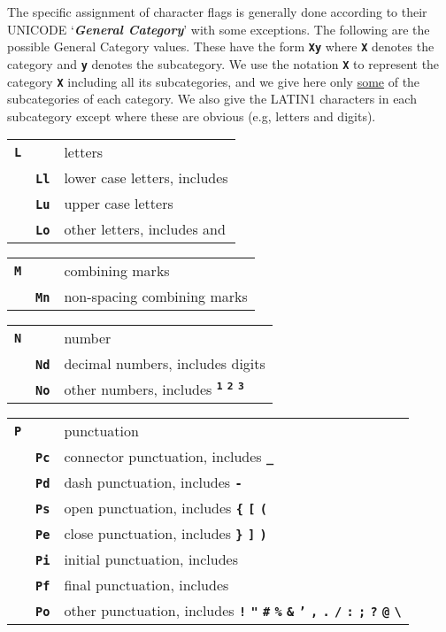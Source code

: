 \documentclass[12pt]{article}
\newcommand{\TT}[1]{{\tt \bfseries #1}}
\newcommand{\key}[1]{{\bf \em #1}\index{#1}}
\newenvironment{indpar}[1][0.3in]%
	{\begin{list}{}%
		     {\setlength{\itemsep}{0in}%
		      \setlength{\topsep}{0in}%
		      \setlength{\parsep}{1ex}%
		      \setlength{\labelwidth}{#1}%
		      \setlength{\leftmargin}{#1}%
		      \addtolength{\leftmargin}{\labelsep}}%
	 \item}%
	{\end{list}}
\begin{document}
The specific assignment of character flags is generally done
according to their
UNICODE `\key{General Category}' with some exceptions.
The following are the possible General Category values.
These have the form \TT{Xy} where \TT{X} denotes the category
and \TT{y} denotes the subcategory.  We use the notation
\TT{X} to represent the category \TT{X} including all its
subcategories, and we give here only \underline{some} of the
subcategories of each category.  We also give the LATIN1 characters
in each subcategory except where these are obvious (e.g, letters
and digits).
\begin{indpar}
\begin{tabular}{ll}
\TT{L}		& letters \\
~~~\TT{Ll}	& lower case letters, includes \TT{\textmu} \\
~~~\TT{Lu}	& upper case letters \\
~~~\TT{Lo}	& other letters, includes
                  \TT{\textordmasculine} and \TT{\textordfeminine} \\
\end{tabular}

\begin{tabular}{ll}
\TT{M}		& combining marks \\
~~~\TT{Mn}	& non-spacing combining marks \\
\end{tabular}

\begin{tabular}{ll}
\TT{N}		& number \\
~~~\TT{Nd}	& decimal numbers, includes digits \\
~~~\TT{No}	& other numbers, includes
                  \TT{\textsuperscript{1}}
                  \TT{\textsuperscript{2}}
		  \TT{\textsuperscript{3}}
		  \TT{\textonequarter}
		  \TT{\textonehalf}
		  \TT{\textthreequarters} \\
\end{tabular}

\begin{tabular}{ll}
\TT{P}		& punctuation \\
~~~\TT{Pc}	& connector punctuation, includes \TT{\_} \\
~~~\TT{Pd}	& dash punctuation, includes \TT{-} \\
~~~\TT{Ps}	& open punctuation, includes \TT{\{} \TT{[} \TT{(} \\
~~~\TT{Pe}	& close punctuation, includes \TT{\}} \TT{]} \TT{)} \\
~~~\TT{Pi}	& initial punctuation, includes \TT{\guillemotleft} \\
~~~\TT{Pf}	& final punctuation, includes \TT{\guillemotright} \\
~~~\TT{Po}	& other punctuation, includes
                  \TT{!} \TT{"} \TT{\#} \TT{\%} \TT{\&} \TT{'} \TT{*}
		  \TT{,} \TT{.} \TT{/} \TT{:} \TT{;} \TT{?} \TT{@}
		  \TT{\textbackslash}
		  \TT{\textexclamdown}
		  \TT{\textsection}
		  \TT{\textpilcrow}
		  \TT{\textperiodcentered}
		  \TT{\textquestiondown} \\
\end{tabular}


\end{indpar}
\end{document}
